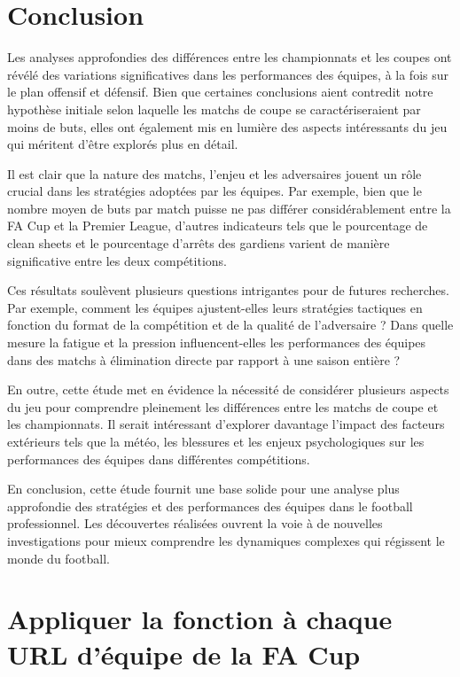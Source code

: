 \documentclass[
]{article}
\begin{document}
\section{Conclusion}\label{conclusion-2}

Les analyses approfondies des différences entre les championnats et les
coupes ont révélé des variations significatives dans les performances
des équipes, à la fois sur le plan offensif et défensif. Bien que
certaines conclusions aient contredit notre hypothèse initiale selon
laquelle les matchs de coupe se caractériseraient par moins de buts,
elles ont également mis en lumière des aspects intéressants du jeu qui
méritent d'être explorés plus en détail.

Il est clair que la nature des matchs, l'enjeu et les adversaires jouent
un rôle crucial dans les stratégies adoptées par les équipes. Par
exemple, bien que le nombre moyen de buts par match puisse ne pas
différer considérablement entre la FA Cup et la Premier League, d'autres
indicateurs tels que le pourcentage de clean sheets et le pourcentage
d'arrêts des gardiens varient de manière significative entre les deux
compétitions.

Ces résultats soulèvent plusieurs questions intrigantes pour de futures
recherches. Par exemple, comment les équipes ajustent-elles leurs
stratégies tactiques en fonction du format de la compétition et de la
qualité de l'adversaire ? Dans quelle mesure la fatigue et la pression
influencent-elles les performances des équipes dans des matchs à
élimination directe par rapport à une saison entière ?

En outre, cette étude met en évidence la nécessité de considérer
plusieurs aspects du jeu pour comprendre pleinement les différences
entre les matchs de coupe et les championnats. Il serait intéressant
d'explorer davantage l'impact des facteurs extérieurs tels que la météo,
les blessures et les enjeux psychologiques sur les performances des
équipes dans différentes compétitions.

En conclusion, cette étude fournit une base solide pour une analyse plus
approfondie des stratégies et des performances des équipes dans le
football professionnel. Les découvertes réalisées ouvrent la voie à de
nouvelles investigations pour mieux comprendre les dynamiques complexes
qui régissent le monde du football.

\section{Appliquer la fonction à chaque URL d'équipe de la FA
Cup}\label{appliquer-la-fonction-uxe0-chaque-url-duxe9quipe-de-la-fa-cup}
\end{document}
